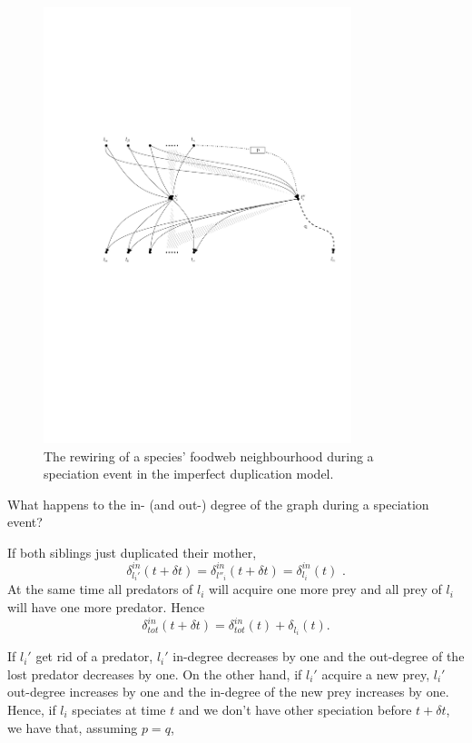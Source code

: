 \documentclass[12pt,a4paper]{report}
\begin{document}
\begin{figure}[ht]
	\centering
		\includegraphics[width=0.8\textwidth]{images/fwspec1p}
		\caption{The rewiring of a species' foodweb neighbourhood during a speciation event in the imperfect duplication model.}
		\label{fig:fwspec1p}
\end{figure}

What happens to the in- (and out-) degree of the graph during a speciation event?

If both siblings just duplicated their mother, $$\delta^{in}_{l_i'}(t+\delta t)=\delta^{in}_{l''_i}(t+\delta t)=\delta^{in}_{l_i}(t) \, \, .$$ At the same time all predators of $l_i$ will acquire one more prey and all prey of $l_i$ will have one more predator.
Hence $$\delta^{in}_{tot}(t + \delta t) = \delta^{in}_{tot}(t) + \delta_{l_i}(t).$$

If $l_i'$ get rid of a predator, $l_i'$ in-degree decreases by one and the out-degree of the lost predator decreases by one. On the other hand, if $l_i'$ acquire a new prey, $l_i'$ out-degree increases by one and the in-degree of the new prey increases by one. Hence, if $l_i$ speciates at time $t$ and we don't have other speciation before $t + \delta t$, we have that, assuming $p = q$,
\end{document}
